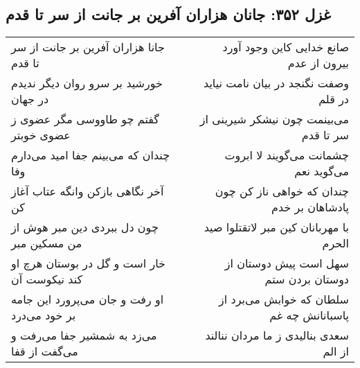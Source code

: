 \begin{center}
\section*{غزل ۳۵۲: جانان هزاران آفرین بر جانت از سر تا قدم}
\label{sec:352}
\begin{longtable}{l p{0.5cm} r}
جانا هزاران آفرین بر جانت از سر تا قدم
&&
صانع خدایی کاین وجود آورد بیرون از عدم
\\
خورشید بر سرو روان دیگر ندیدم در جهان
&&
وصفت نگنجد در بیان نامت نیاید در قلم
\\
گفتم چو طاووسی مگر عضوی ز عضوی خوبتر
&&
می‌بینمت چون نیشکر شیرینی از سر تا قدم
\\
چندان که می‌بینم جفا امید می‌دارم وفا
&&
چشمانت می‌گویند لا ابروت می‌گوید نعم
\\
آخر نگاهی بازکن وانگه عتاب آغاز کن
&&
چندان که خواهی ناز کن چون پادشاهان بر خدم
\\
چون دل ببردی دین مبر هوش از من مسکین مبر
&&
با مهربانان کین مبر لاتقتلوا صید الحرم
\\
خار است و گل در بوستان هرچ او کند نیکوست آن
&&
سهل است پیش دوستان از دوستان بردن ستم
\\
او رفت و جان می‌پرورد این جامه بر خود می‌درد
&&
سلطان که خوابش می‌برد از پاسبانانش چه غم
\\
می‌زد به شمشیر جفا می‌رفت و می‌گفت از قفا
&&
سعدی بنالیدی ز ما مردان ننالند از الم
\\
\end{longtable}
\end{center}

